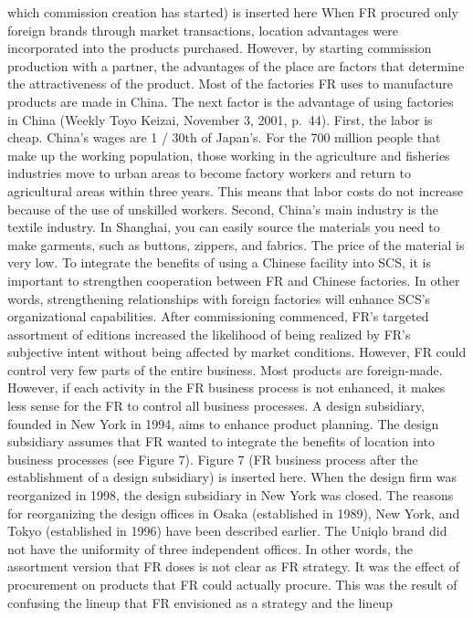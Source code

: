 \documentclass[]{article}
\begin{document}
which commission creation has started) is inserted here When FR procured
only foreign brands through market transactions, location advantages
were incorporated into the products purchased. However, by starting
commission production with a partner, the advantages of the place are
factors that determine the attractiveness of the product. Most of the
factories FR uses to manufacture products are made in China. The next
factor is the advantage of using factories in China (Weekly Toyo Keizai,
November 3, 2001, p.~44). First, the labor is cheap. China's wages are 1
/ 30th of Japan's. For the 700 million people that make up the working
population, those working in the agriculture and fisheries industries
move to urban areas to become factory workers and return to agricultural
areas within three years. This means that labor costs do not increase
because of the use of unskilled workers. Second, China's main industry
is the textile industry. In Shanghai, you can easily source the
materials you need to make garments, such as buttons, zippers, and
fabrics. The price of the material is very low. To integrate the
benefits of using a Chinese facility into SCS, it is important to
strengthen cooperation between FR and Chinese factories. In other words,
strengthening relationships with foreign factories will enhance SCS's
organizational capabilities. After commissioning commenced, FR's
targeted assortment of editions increased the likelihood of being
realized by FR's subjective intent without being affected by market
conditions. However, FR could control very few parts of the entire
business. Most products are foreign-made. However, if each activity in
the FR business process is not enhanced, it makes less sense for the FR
to control all business processes. A design subsidiary, founded in New
York in 1994, aims to enhance product planning. The design subsidiary
assumes that FR wanted to integrate the benefits of location into
business processes (see Figure 7). Figure 7 (FR business process after
the establishment of a design subsidiary) is inserted here. When the
design firm was reorganized in 1998, the design subsidiary in New York
was closed. The reasons for reorganizing the design offices in Osaka
(established in 1989), New York, and Tokyo (established in 1996) have
been described earlier. The Uniqlo brand did not have the uniformity of
three independent offices. In other words, the assortment version that
FR doses is not clear as FR strategy. It was the effect of procurement
on products that FR could actually procure. This was the result of
confusing the lineup that FR envisioned as a strategy and the lineup
\end{document}
